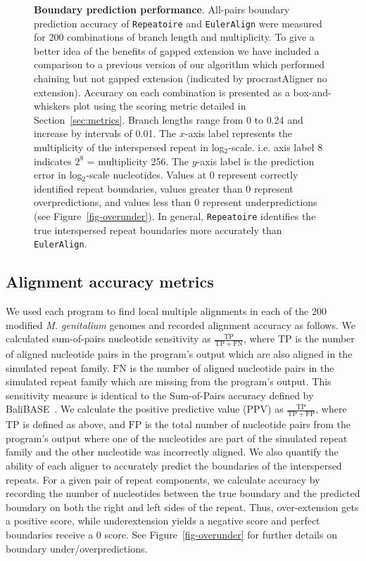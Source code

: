 \documentclass[12pt,journal,draftcls,letterpaper,onecolumn]{IEEEtran}
\begin{document}
\begin{figure*}[t!]
\centering
{}
\label{fig:subfig1}
\caption[Boundary prediction performance]%
{\textbf{Boundary prediction performance}. All-pairs boundary prediction accuracy of \texttt{Repeatoire} and \texttt{EulerAlign} were measured for 200 combinations of branch length and multiplicity.  To give a better idea of the benefits of gapped extension we have included a comparison to a previous version of our algorithm which performed chaining but not gapped extension (indicated by procrastAligner no extension). Accuracy on each combination is presented as a box-and-whiskers plot using the scoring metric detailed in Section~\ref{sec:metrics}.  Branch lengths range from 0 to 0.24 and increase by intervals of 0.01.  The $x$-axis label represents the multiplicity of the interspersed repeat in log$_2$-scale. i.e. axis label 8 indicates $2^{8}$ = multiplicity 256. The $y$-axis label is the prediction error in log$_2$-scale nucleotides. Values at 0 represent correctly identified repeat boundaries, values greater than 0 represent overpredictions, and values less than 0 represent underpredictions (see Figure~\ref{fig-overunder}). In general, \texttt{Repeatoire} identifies the true interspersed repeat boundaries more accurately than \texttt{EulerAlign}.}
\label{fig-boundary}
\end{figure*}
\subsection*{Alignment accuracy metrics}
\label{sec:metrics}
We used each program to find local multiple alignments in each of the
200 modified \emph{M. genitalium} genomes and recorded alignment
accuracy as follows. We calculated sum-of-pairs nucleotide sensitivity
as $\frac{\mathrm{TP}}{\mathrm{TP} + \mathrm{FN}}$, where
$\mathrm{TP}$ is the number of aligned nucleotide pairs in the
program's output which are also aligned in the simulated repeat
family.  $\mathrm{FN}$ is the number of aligned nucleotide pairs in
the simulated repeat family which are missing from the program's
output.  This sensitivity measure is identical to the Sum-of-Pairs
accuracy defined by BaliBASE~\cite{ref-balibase}.  We calculate the
positive predictive value (PPV) as $\frac{\mathrm{TP}}{\mathrm{TP} +
\mathrm{FP}}$, where $\mathrm{TP}$ is defined as above, and
$\mathrm{FP}$ is the total number of nucleotide pairs from the
program's output where one of the nucleotides are part of the
simulated repeat family and the other nucleotide was incorrectly
aligned. We also quantify the ability of each aligner to accurately predict the
boundaries of the interspersed repeats.  For a given pair of repeat components, we calculate accuracy by recording the number of nucleotides between the true boundary and the predicted boundary
on both the right and left sides of the repeat.  Thus, over-extension gets a positive score, while underextension
yields a negative score and perfect boundaries receive a 0 score. See Figure~\ref{fig-overunder} for
further details on boundary under/overpredictions.
\end{document}
